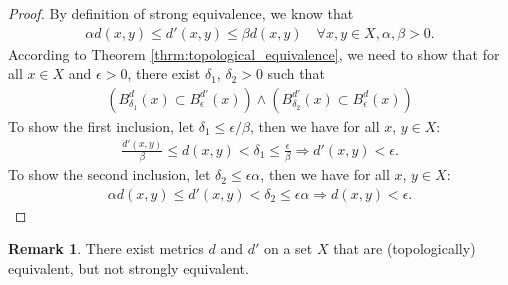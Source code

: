\documentclass[12pt, a4paper]{article}
\numberwithin{equation}{section}
\theoremstyle{definition}
\theoremstyle{definition}
\newtheorem{remark}[thm]{Remark} %
\begin{document}
		\begin{proof}\cite{1379634}
			By definition of strong equivalence, we know that 
			\begin{align}
				\alpha d(x, y) \leq d'(x, y) \leq \beta d(x, y) \quad\forall x, y\in X, \alpha, \beta > 0.
			\end{align}
			According to Theorem \ref{thrm:topological_equivalence}, we need to show that for all $x\in X$ and $\epsilon > 0$, there exist $\delta_1$, $\delta_2 > 0$ such that 
			\begin{align}
				\left(B_{\delta_1}^{d}(x) \subset B_{\epsilon}^{d'}(x)\right) \wedge \left(B^{d'}_{\delta_2}(x) \subset B^{d}_{\epsilon}(x)\right)
			\end{align}
			To show the first inclusion, let $\delta_1 \leq \epsilon/\beta$, then we have for all $x$, $y\in X$:
			\begin{align}
				\frac{d'(x, y)}{\beta} \leq d(x, y) < \delta_1 \leq \frac{\epsilon}{\beta} \Rightarrow d'(x, y) < \epsilon.
			\end{align}
			To show the second inclusion, let $\delta_2 \leq \epsilon\alpha$, then we have for all $x$, $y\in X$:
			\begin{align}
				\alpha d(x, y)\leq d'(x, y) < \delta_2 \leq \epsilon\alpha \Rightarrow d(x, y) < \epsilon.
			\end{align}
		\end{proof}
		
		\begin{remark}
			There exist metrics $d$ and $d'$ on a set $X$ that are (topologically) equivalent, but not strongly equivalent. \cite{5065146}
		\end{remark}
		
\end{document}
